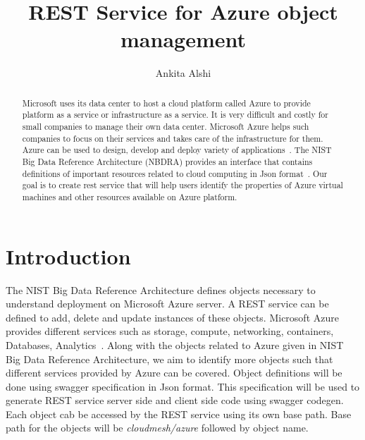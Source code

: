 
\title{REST Service for Azure object management}


\author{Ankita Alshi}


\renewcommand{\shortauthors}{Ankita Alshi}

\begin{abstract}
Microsoft uses its data center to host a cloud platform called Azure to
provide platform as a service or infrastructure as a service. It is very
difficult and costly for small companies to manage their own data center.
Microsoft Azure helps such companies to focus on their services and takes care
of the infrastructure for them. Azure can be used to design, develop and deploy
variety of applications~\cite{hid-sp18-502-microsoft-azure}. The NIST Big Data
 Reference Architecture (NBDRA) provides an interface that contains definitions
 of important resources related to cloud computing in Json
 format~\cite{hid-sp18-502-nist-vol8}. Our goal is to create rest service that
 will help users identify the properties of Azure virtual machines and other
 resources available on Azure platform.

\end{abstract}



\maketitle

\section{Introduction}
The NIST Big Data Reference Architecture defines objects necessary to
understand deployment on Microsoft Azure server. A REST service can be defined
to add, delete and update instances of these objects. Microsoft Azure
provides different services such as storage, compute, networking,
containers, Databases, Analytics~\cite{hid-sp18-502-microsoft-azure}. Along with
 the objects related to Azure given in NIST Big Data Reference Architecture, we
 aim to identify more objects such that different services provided by Azure can
 be covered. Object definitions will be done using swagger specification in
 Json format. This specification will be used to generate REST service server
 side and client side code using swagger codegen. Each object cab be accessed
 by the REST service using its own base path. Base path for the objects will be
 \emph{cloudmesh/azure} followed by object name.


